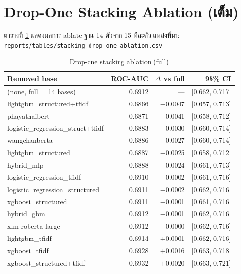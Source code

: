 \section{Drop-One Stacking Ablation (เต็ม)}
\label{app:drop-one-full}

ตารางที่ \ref{tab:drop-one-full} แสดงผลการ ablate ฐาน 14 ตัวจาก 15 ทีละตัว
แหล่งที่มา: \texttt{reports/tables/stacking\_drop\_one\_ablation.csv}

\begin{longtable}{lrrr}
\caption{Drop-one stacking ablation (full)}
\label{tab:drop-one-full} \\
\toprule
\textbf{Removed base} & \textbf{ROC-AUC} & \textbf{$\Delta$ vs full} & \textbf{95\% CI} \\
\midrule
\endhead
(none, full = 14 bases)             & 0.6912 & ---       & [0.662, 0.717] \\
lightgbm\_structured+tfidf          & 0.6866 & $-$0.0047 & [0.657, 0.713] \\
phayathaibert                       & 0.6871 & $-$0.0041 & [0.658, 0.712] \\
logistic\_regression\_struct+tfidf  & 0.6883 & $-$0.0030 & [0.660, 0.714] \\
wangchanberta                       & 0.6886 & $-$0.0027 & [0.660, 0.714] \\
lightgbm\_structured                & 0.6887 & $-$0.0025 & [0.658, 0.712] \\
hybrid\_mlp                         & 0.6888 & $-$0.0024 & [0.661, 0.713] \\
logistic\_regression\_tfidf         & 0.6910 & $-$0.0002 & [0.661, 0.716] \\
logistic\_regression\_structured    & 0.6911 & $-$0.0002 & [0.662, 0.716] \\
xgboost\_structured                 & 0.6911 & $-$0.0001 & [0.661, 0.716] \\
hybrid\_gbm                         & 0.6912 & $-$0.0001 & [0.662, 0.716] \\
xlm-roberta-large                   & 0.6912 & $-$0.0000 & [0.662, 0.716] \\
lightgbm\_tfidf                     & 0.6914 & $+$0.0001 & [0.662, 0.716] \\
xgboost\_tfidf                      & 0.6928 & $+$0.0016 & [0.663, 0.718] \\
xgboost\_structured+tfidf           & 0.6932 & $+$0.0020 & [0.663, 0.721] \\
\bottomrule
\end{longtable}

